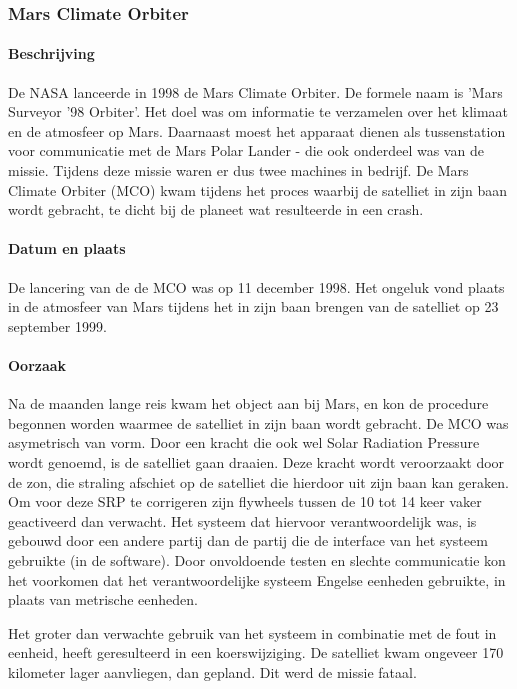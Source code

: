 \documentclass{article}
\begin{document}
			\subsubsection{Mars Climate Orbiter}

				\paragraph{Beschrijving}

					De NASA lanceerde in 1998 de Mars Climate Orbiter. De formele naam is 'Mars Surveyor '98 Orbiter'. Het doel was om informatie te verzamelen over het klimaat en de atmosfeer op Mars. Daarnaast moest het apparaat dienen als tussenstation voor communicatie met de Mars Polar Lander - die ook onderdeel was van de missie. Tijdens deze missie waren er dus twee machines in bedrijf. De Mars Climate Orbiter (MCO) kwam tijdens het proces waarbij de satelliet in zijn baan wordt gebracht, te dicht bij de planeet wat resulteerde in een crash.

				\paragraph{Datum en plaats}

					De lancering van de de MCO was op 11 december 1998. Het ongeluk vond plaats in de atmosfeer van Mars tijdens het in zijn baan brengen van de satelliet op 23 september 1999.

				\paragraph{Oorzaak}

					Na de maanden lange reis kwam het object aan bij Mars, en kon de procedure begonnen worden waarmee de satelliet in zijn baan wordt gebracht. De MCO was asymetrisch van vorm. Door een kracht die ook wel Solar Radiation Pressure wordt genoemd, is de satelliet gaan draaien. Deze kracht wordt veroorzaakt door de zon, die straling afschiet op de satelliet die hierdoor uit zijn baan kan geraken. \cite{yousef2022balancing} Om voor deze SRP te corrigeren zijn flywheels tussen de 10 tot 14 keer vaker geactiveerd dan verwacht. Het systeem dat hiervoor verantwoordelijk was, is gebouwd door een andere partij dan de partij die de interface van het systeem gebruikte (in de software). Door onvoldoende testen en slechte communicatie kon het voorkomen dat het verantwoordelijke systeem Engelse eenheden gebruikte, in plaats van metrische eenheden. \par
					Het groter dan verwachte gebruik van het systeem in combinatie met de fout in eenheid, heeft geresulteerd in een koerswijziging. De satelliet kwam ongeveer 170 kilometer lager aanvliegen, dan gepland. Dit werd de missie fataal. \cite{stephenson1999mars} \par
\end{document}
